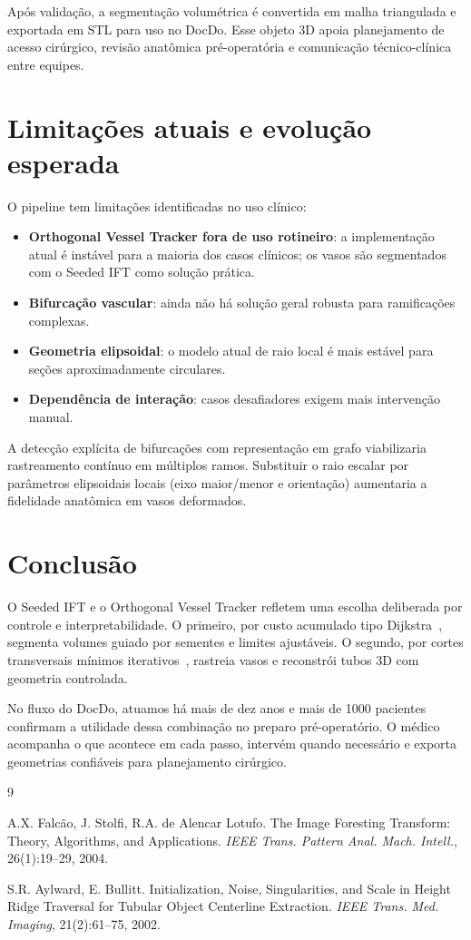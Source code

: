 \documentclass[12pt,a4paper]{article}
\begin{document}
Após validação, a segmentação volumétrica é convertida em malha triangulada e exportada em STL para uso no DocDo. Esse objeto 3D apoia planejamento de acesso cirúrgico, revisão anatômica pré-operatória e comunicação técnico-clínica entre equipes.

\section{Limitações atuais e evolução esperada}

O pipeline tem limitações identificadas no uso clínico:
\begin{itemize}
	\item \textbf{Orthogonal Vessel Tracker fora de uso rotineiro}: a implementação atual é instável para a maioria dos casos clínicos; os vasos são segmentados com o Seeded IFT como solução prática.
	\item \textbf{Bifurcação vascular}: ainda não há solução geral robusta para ramificações complexas.
	\item \textbf{Geometria elipsoidal}: o modelo atual de raio local é mais estável para seções aproximadamente circulares.
	\item \textbf{Dependência de interação}: casos desafiadores exigem mais intervenção manual.
\end{itemize}

A detecção explícita de bifurcações com representação em grafo viabilizaria rastreamento contínuo em múltiplos ramos. Substituir o raio escalar por parâmetros elipsoidais locais (eixo maior/menor e orientação) aumentaria a fidelidade anatômica em vasos deformados.

\section{Conclusão}

O Seeded IFT e o Orthogonal Vessel Tracker refletem uma escolha deliberada por controle e interpretabilidade. O primeiro, por custo acumulado tipo Dijkstra~\cite{falcao2004}, segmenta volumes guiado por sementes e limites ajustáveis. O segundo, por cortes transversais mínimos iterativos~\cite{aylward2002}, rastreia vasos e reconstrói tubos 3D com geometria controlada.

No fluxo do DocDo, atuamos há mais de dez anos e mais de 1000 pacientes confirmam a utilidade dessa combinação no preparo pré-operatório. O médico acompanha o que acontece em cada passo, intervém quando necessário e exporta geometrias confiáveis para planejamento cirúrgico.

\begin{thebibliography}{9}

A.X. Falcão, J. Stolfi, R.A. de Alencar Lotufo.
\newblock The Image Foresting Transform: Theory, Algorithms, and Applications.
\newblock \textit{IEEE Trans. Pattern Anal. Mach. Intell.}, 26(1):19--29, 2004.

S.R. Aylward, E. Bullitt.
\newblock Initialization, Noise, Singularities, and Scale in Height Ridge Traversal for Tubular Object Centerline Extraction.
\newblock \textit{IEEE Trans. Med. Imaging}, 21(2):61--75, 2002.

\end{thebibliography}
\end{document}

